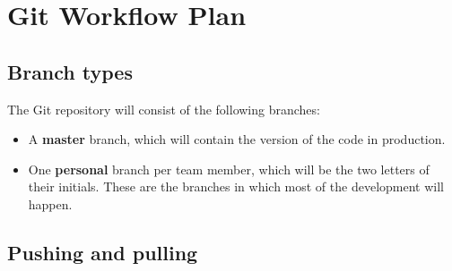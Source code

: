 \documentclass{article}
\begin{document}
\section{Git Workflow Plan}

\subsection{Branch types}
The Git repository will consist of the following branches:

\begin{itemize}
  \item A \textbf{master} branch, which will contain the version of the code in production.

  \item One \textbf{personal} branch per team member, which will be the two letters of their initials. These are the branches in which most of the development will happen.
\end{itemize}

\subsection{Pushing and pulling}
\end{document}

